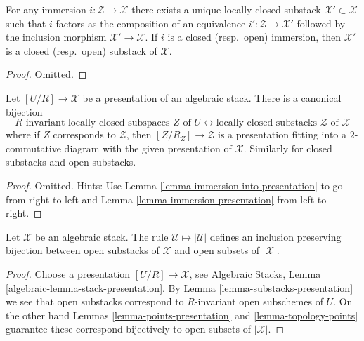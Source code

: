 \begin{lemma}
\label{lemma-substack-image}
For any immersion $i : \mathcal{Z} \to \mathcal{X}$ there exists a
unique locally closed substack $\mathcal{X}' \subset \mathcal{X}$
such that $i$ factors as the composition of
an equivalence $i' : \mathcal{Z} \to \mathcal{X}'$
followed by the inclusion morphism $\mathcal{X}' \to \mathcal{X}$.
If $i$ is a closed (resp.\ open) immersion, then $\mathcal{X}'$
is a closed (resp.\ open) substack of $\mathcal{X}$.
\end{lemma}

\begin{proof}
Omitted.
\end{proof}

\begin{lemma}
\label{lemma-substacks-presentation}
Let $[U/R] \to \mathcal{X}$ be a presentation of an algebraic stack.
There is a canonical bijection
$$
R\text{-invariant locally closed subspaces }Z\text{ of }U
\leftrightarrow
\text{locally closed substacks }\mathcal{Z}\text{ of }\mathcal{X}
$$
where if $Z$ corresponds to $\mathcal{Z}$, then
$[Z/R_Z] \to \mathcal{Z}$ is a presentation fitting into a $2$-commutative
diagram with the given presentation of $\mathcal{X}$.
Similarly for closed substacks and open substacks.
\end{lemma}

\begin{proof}
Omitted. Hints: Use
Lemma \ref{lemma-immersion-into-presentation}
to go from right to left and
Lemma \ref{lemma-immersion-presentation}
from left to right.
\end{proof}

\begin{lemma}
\label{lemma-open-substacks}
Let $\mathcal{X}$ be an algebraic stack. The rule
$\mathcal{U} \mapsto |\mathcal{U}|$ defines an inclusion preserving
bijection between open substacks of $\mathcal{X}$ and open subsets
of $|\mathcal{X}|$.
\end{lemma}

\begin{proof}
Choose a presentation $[U/R] \to \mathcal{X}$, see
Algebraic Stacks, Lemma \ref{algebraic-lemma-stack-presentation}.
By
Lemma \ref{lemma-substacks-presentation}
we see that open substacks correspond to $R$-invariant open subschemes
of $U$. On the other hand
Lemmas \ref{lemma-points-presentation} and \ref{lemma-topology-points}
guarantee these correspond bijectively to open subsets of $|\mathcal{X}|$.
\end{proof}

